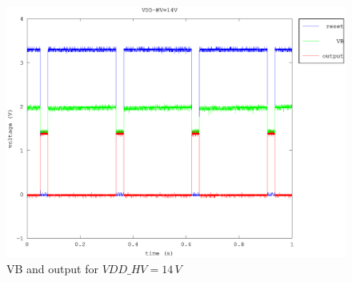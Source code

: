 \documentclass{article}
\begin{document}
\begin{figure}[H]
	\centering
	\includegraphics[width=0.8\linewidth]{fig/VB_14V.eps}
	\caption{VB and output for $VDD\_HV=14\,V$}
	\label{fig:VB_14V}
\end{figure}
\end{document}
